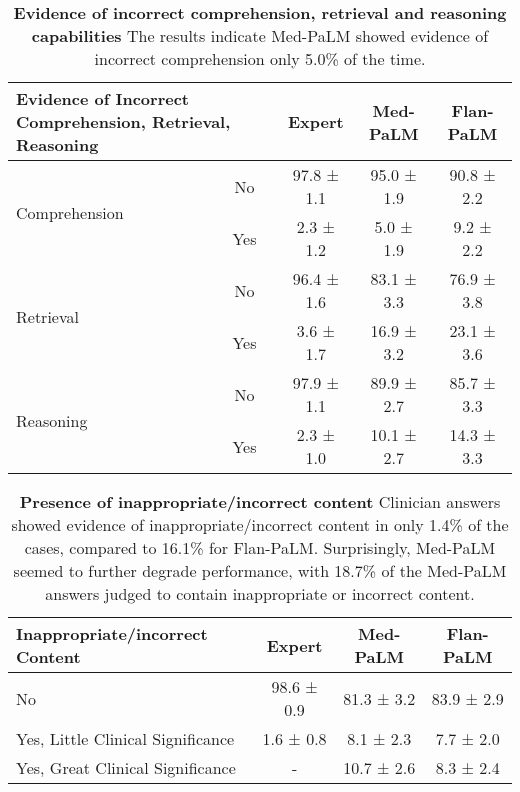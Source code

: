\begin{table}[]
\small
\centering
\caption{\textbf{Evidence of incorrect comprehension, retrieval and reasoning capabilities} The results indicate Med-PaLM showed evidence of incorrect comprehension only 5.0\% of the time.}
\vspace{3pt}
\label{tab:detailed-expert-5}
\begin{tabular}{l|c|ccc}
\toprule
\multicolumn{2}{l|}{\textbf{Evidence of Incorrect Comprehension, Retrieval, Reasoning}} & \textbf{Expert} & \textbf{Med-PaLM} & \textbf{Flan-PaLM} \\ \hline
\multirow{2}{*}{Comprehension} & No  & 97.8  ± 1.1 & 95.0 ± 1.9  & 90.8 ± 2.2 \\
                               & Yes & 2.3 ± 1.2    & 5.0  ± 1.9  & 9.2 ± 2.2  \\ \hline
\multirow{2}{*}{Retrieval}     & No  & 96.4 ± 1.6  & 83.1 ± 3.3  & 76.9 ± 3.8 \\
                               & Yes & 3.6 ± 1.7   & 16.9  ± 3.2 & 23.1 ± 3.6 \\ \hline
\multirow{2}{*}{Reasoning}     & No  & 97.9 ± 1.1  & 89.9 ± 2.7  & 85.7 ± 3.3 \\
                               & Yes & 2.3 ± 1.0   & 10.1  ± 2.7 & 14.3 ± 3.3
                               
                               \\ \bottomrule
\end{tabular}
\end{table}

\begin{table}[]
\small
\centering
\caption{\textbf{Presence of inappropriate/incorrect content} Clinician answers showed evidence of inappropriate/incorrect content in only 1.4\% of the cases, compared to 16.1\% for Flan-PaLM. Surprisingly, Med-PaLM seemed to further degrade performance, with 18.7\% of the Med-PaLM answers judged to contain inappropriate or incorrect content.}
\vspace{3pt}
\label{tab:detailed-expert-6}
\begin{tabular}{l|ccc}
\toprule
\textbf{Inappropriate/incorrect Content} & \textbf{Expert} & \textbf{Med-PaLM} & \textbf{Flan-PaLM} \\ \hline
No                                & 98.6 ± 0.9 & 81.3 ± 3.2 & 83.9 ± 2.9 \\
Yes, Little Clinical Significance & 1.6 ± 0.8  & 8.1 ± 2.3  & 7.7 ± 2.0  \\
Yes, Great Clinical Significance  & -          & 10.7 ± 2.6 & 8.3 ± 2.4  \\ \bottomrule
\end{tabular}
\end{table}



